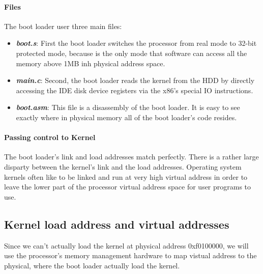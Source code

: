 \documentclass[12pt]{article}
\begin{document}
\paragraph{Files} The boot loader user three main files:
\begin{itemize}
  \item \textit{\textbf{boot.s}}: First the boot loader switches the processor from real mode to 32-bit protected mode, because is the only mode that software can access all the memory above 1MB inh physical address space.
  \item \textit{\textbf{main.c}}: Second, the boot loader reads the kernel from the HDD by directly accessing the IDE disk device registers via the x86's special I\/O instructions.
  \item \textit{\textbf{boot.asm}}: This file is a disassembly of the boot loader. It is easy to see exactly where in physical memory all of the boot loader's code resides.
\end{itemize}
\paragraph{Passing control to Kernel} The boot loader's link and load addresses match perfectly. There is a rather large disparty between the kernel's link and the load addresses. Operating system kernels often like to be linked and run at very high virtual address in order to leave the lower part of the processor virtual address space for user programs to use.

\subsection{Kernel load address and virtual addresses}
Since we can't actually load the kernel at physical address 0xf0100000, we will use the processor's memory management hardware to map vistual address to the physical, where the boot loader actually load the kernel.
\end{document}
